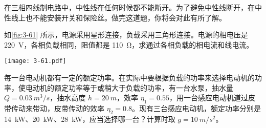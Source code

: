 \begin{Exercise}
\begin{question}
  在三相四线制电路中，中性线在任何时候都不能断开。为了避免中性线断开，在中性线上也不能安装开关和保险丝。做完这道题，你将会对此有所了解。
  \item 如\cref{fig:3-61} 所示，电源采用星形连接，负载采用三角形连接。电源的相电压是 \qty{220}{V}，各相负载相同，阻值都是 \qty{110}{\ohm}，求通过各相负载的相电流和线电流。
  \begin{figurehere}
    \begin{minipage}{\linewidth}\centering
      \texttt{[image: 3-61.pdf]}
      \caption{}\label{fig:3-61}
    \end{minipage}
  \end{figurehere}
  \item 每一台电动机都有一定的额定功率。在实际中要根据负载的功率来选择电动机的功率，使电动机的额定功率等于或稍大于负载的功率，有一台水泵，抽水量 $Q=\qty{0.03}{m^3/s}$，抽水高度 $h=\qty{20}{m}$，效率 $\eta_1=0.55$，用一台感应电动机道过皮带传动来带动，皮带传动的效率 $\eta_2=0.8$。现有三台感应电动机，额定功率分别是 \qty{14}{kW}、\qty{20}{kW}、\qty{28}{kW}，应当选择哪一台？计算时取 $g=\qty{10}{m/s^2}$。
\end{question}
\end{Exercise}
